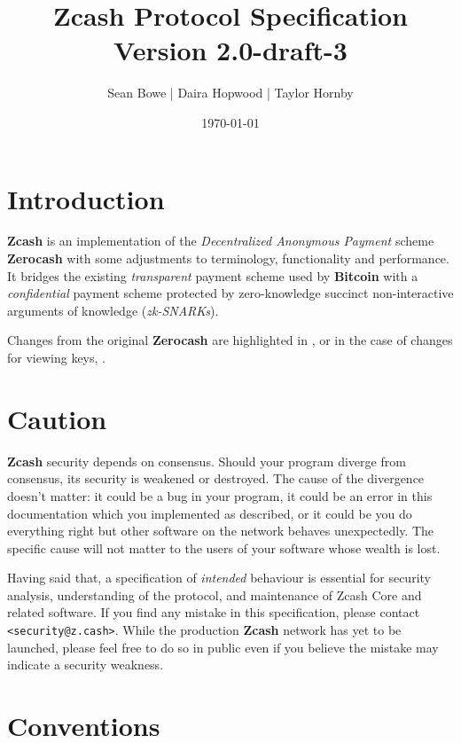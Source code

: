 \documentclass{article}
\newcommand{\doctitle}{Zcash Protocol Specification}
\newcommand{\docversion}{Version 2.0-draft-3}
\newcommand{\authors}{Sean Bowe | Daira Hopwood | Taylor Hornby}
\newcommand{\changedcolor}{magenta}
\newcommand{\setchanged}{\color{\changedcolor}}
\newcommand{\changed}[1]{\texorpdfstring{{\setchanged{#1}}}{#1}}
\newcommand{\vkcolor}{orange}
\newcommand{\setvk}{\color{\vkcolor}}
\newcommand{\vk}[1]{\texorpdfstring{{\setvk{#1}}}{#1}}
\newcommand{\term}[1]{\textsl{#1}\xspace}
\newcommand{\termbf}[1]{\textbf{#1}\xspace}
\newcommand{\Zcash}{\termbf{Zcash}}
\newcommand{\Zerocash}{\termbf{Zerocash}}
\newcommand{\Bitcoin}{\termbf{Bitcoin}}
\newcommand{\zkSNARKs}{\term{zk-SNARKs}}
\begin{document}
\title{\doctitle \\
\Large \docversion}
\author{\authors}
\date{\today}
\maketitle

\tableofcontents
\newpage


\section{Introduction}

\Zcash is an implementation of the \term{Decentralized Anonymous Payment}
scheme \Zerocash \cite{ZerocashOakland} with some adjustments to terminology,
functionality and performance. It bridges the existing \emph{transparent}
payment scheme used by \Bitcoin with a \emph{confidential} payment scheme
protected by zero-knowledge succinct non-interactive arguments of knowledge
(\zkSNARKs).

Changes from the original \Zerocash are highlighted in \changed{\changedcolor},
or in the case of changes for viewing keys, \vk{\vkcolor}.


\section{Caution}

\Zcash security depends on consensus. Should your program diverge from
consensus, its security is weakened or destroyed. The cause of the divergence
doesn't matter: it could be a bug in your program, it could be an error in
this documentation which you implemented as described, or it could be you do
everything right but other software on the network behaves unexpectedly. The
specific cause will not matter to the users of your software whose wealth is
lost.

Having said that, a specification of \emph{intended} behaviour is essential
for security analysis, understanding of the protocol, and maintenance of
Zcash Core and related software. If you find any mistake in this specification,
please contact \texttt{<security@z.cash>}. While the production \Zcash network
has yet to be launched, please feel free to do so in public even if you believe
the mistake may indicate a security weakness.


\section{Conventions}
\end{document}
